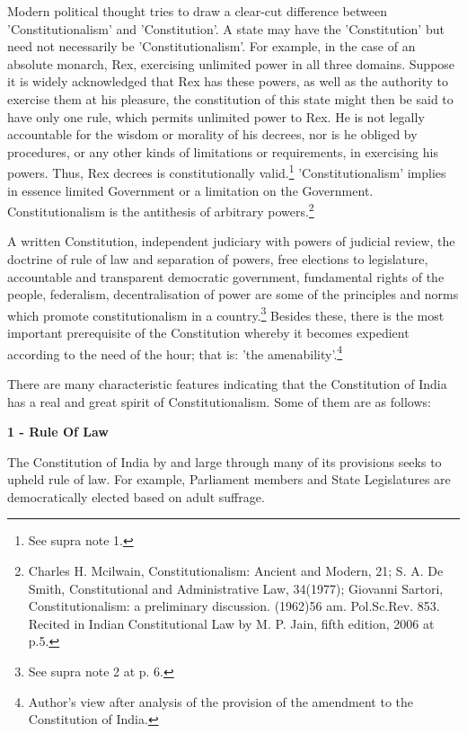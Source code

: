 \begin{multicols}{2}
\noi
Modern political thought tries to draw a clear-cut difference between 'Constitutionalism' and
'Constitution'. A state may have the 'Constitution' but need not necessarily be 'Constitutionalism'.
For example, in the case of an absolute monarch, Rex, exercising unlimited power in all three
domains. Suppose it is widely acknowledged that Rex has these powers, as well as the authority
to exercise them at his pleasure, the constitution of this state might then be said to have only one
rule, which permits unlimited power to Rex. He is not legally accountable for the wisdom or
morality of his decrees, nor is he obliged by procedures, or any other kinds of limitations or
requirements, in exercising his powers. Thus, Rex decrees is constitutionally valid.\footnote{See supra note 1.} 'Constitutionalism' implies in essence limited Government or a limitation on the Government.
Constitutionalism is the antithesis of arbitrary powers.\footnote{Charles H. Mcilwain, Constitutionalism: Ancient and Modern, 21; S. A. De Smith, Constitutional and Administrative Law, 34(1977); Giovanni Sartori, Constitutionalism: a preliminary discussion. (1962)56 am. Pol.Sc.Rev. 853. Recited in Indian Constitutional Law by M. P. Jain, fifth edition, 2006 at p.5.}


\noi
A written Constitution, independent judiciary with powers of judicial review, the doctrine of rule
of law and separation of powers, free elections to legislature, accountable and transparent
democratic government, fundamental rights of the people, federalism, decentralisation of power
are some of the principles and norms which promote constitutionalism in a country.\footnote{See supra note 2 at p. 6.} Besides these, there is the most important prerequisite of the Constitution whereby it becomes expedient according to the need of the hour; that is: 'the amenability'.\footnote{Author's view after analysis of the provision of the amendment to the Constitution of India.}

\noi
There are many characteristic features indicating that the Constitution of India has a real and great
spirit of Constitutionalism. Some of them are as follows:

\noi
{\large \bfseries 1 - Rule Of Law}

\noi
The Constitution of India by and large through many of its provisions seeks to upheld rule of law.
For example, Parliament members and State Legislatures are democratically elected based on
adult suffrage.


\end{multicols}
